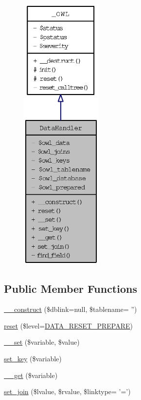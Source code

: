 \begin{figure}[H]
\begin{center}
\leavevmode
\includegraphics[height=400pt]{classDataHandler__coll__graph}
\end{center}
\end{figure}
\subsection*{Public Member Functions}
\begin{CompactItemize}
\item 
\hyperlink{classDataHandler_4eef16167dd9a5bc94bd0cb40ce1b180}{\_\-\_\-construct} (\$dblink=null, \$tablename= '')
\item 
\hyperlink{classDataHandler_b89e1aaad9cd0a37f1c7f13c1d9c0d57}{reset} (\$level=\hyperlink{class_8datahandler_8php_19a99423705b41e563424ae76d7fe184}{DATA\_\-RESET\_\-PREPARE})
\item 
\hyperlink{classDataHandler_16c81c9564a7feaf530ce5d51ed99df7}{\_\-\_\-set} (\$variable, \$value)
\item 
\hyperlink{classDataHandler_32ce223478b78a4ea9838a3c6ac7440c}{set\_\-key} (\$variable)
\item 
\hyperlink{classDataHandler_f58cbd10b032e4904fa15ce950d521e2}{\_\-\_\-get} (\$variable)
\item 
\hyperlink{classDataHandler_9b77733f02e9d6281fc40df110c0ba70}{set\_\-join} (\$lvalue, \$rvalue, \$linktype= '=')
\end{CompactItemize}
